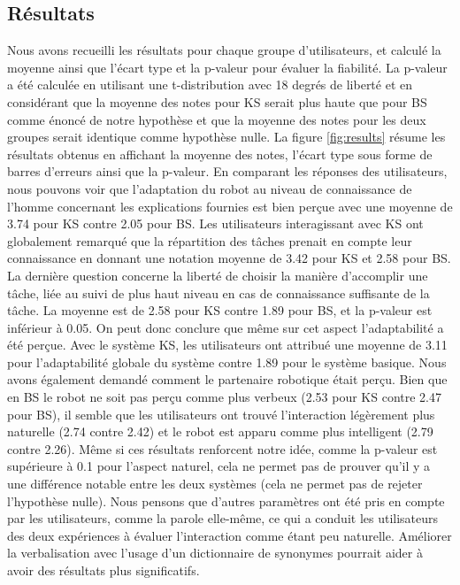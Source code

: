 \documentclass[a4paper,11pt,twoside]{StyleThese}
\begin{document}
\subsection{Résultats}

Nous avons recueilli les résultats pour chaque groupe d'utilisateurs, et calculé la moyenne ainsi que l'écart type et la p-valeur pour évaluer la fiabilité. La p-valeur a été calculée en utilisant une t-distribution avec 18 degrés de liberté et en considérant que la moyenne des notes pour KS serait plus haute que pour BS comme énoncé de notre hypothèse et que la moyenne des notes pour les deux groupes serait identique comme hypothèse nulle.
La figure \ref{fig:results} résume les résultats obtenus en affichant la moyenne des notes, l'écart type sous forme de barres d'erreurs ainsi que la p-valeur. En comparant les réponses des utilisateurs, nous pouvons voir que l'adaptation du robot au niveau de connaissance de l'homme concernant les explications fournies est bien perçue avec une moyenne de 3.74 pour KS contre 2.05 pour BS. Les utilisateurs interagissant avec KS ont globalement remarqué que la répartition des tâches prenait en compte leur connaissance en donnant une notation moyenne de 3.42 pour KS et 2.58 pour BS. La dernière question concerne la liberté de choisir la manière d'accomplir une tâche, liée au suivi de plus haut niveau en cas de connaissance suffisante de la tâche. La moyenne est de 2.58 pour KS contre 1.89 pour BS, et la p-valeur est inférieur à 0.05. On peut donc conclure que même sur cet aspect l'adaptabilité a été perçue.
Avec le système KS, les utilisateurs ont attribué une moyenne de 3.11 pour l'adaptabilité globale du système contre 1.89 pour le système basique.
Nous avons également demandé comment le partenaire robotique était perçu. Bien que en BS le robot ne soit pas perçu comme plus verbeux (2.53 pour KS contre 2.47 pour BS), il semble que les utilisateurs ont trouvé l'interaction légèrement plus naturelle (2.74 contre 2.42) et le robot est apparu comme plus intelligent (2.79 contre 2.26). Même si ces résultats renforcent notre idée, comme la p-valeur est supérieure à 0.1 pour l'aspect naturel, cela ne permet pas de prouver qu'il y a une différence notable entre les deux systèmes (cela ne permet pas de rejeter l'hypothèse nulle).
Nous pensons que d'autres paramètres ont été pris en compte par les utilisateurs, comme la parole elle-même, ce qui a conduit les utilisateurs des deux expériences à évaluer l'interaction comme étant peu naturelle. Améliorer la verbalisation avec l'usage d'un dictionnaire de synonymes pourrait aider à avoir des résultats plus significatifs.
\end{document}
